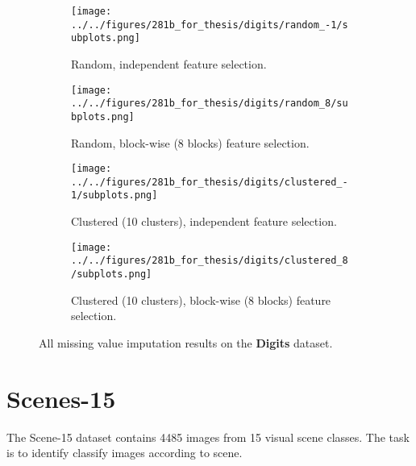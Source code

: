\begin{figure}[ht]
    \centering
    \begin{subfigure}[b]{.9\textwidth}
        \centering
        \texttt{[image: ../../figures/281b\_for\_thesis/digits/random\_-1/subplots.png]}
        \caption{Random, independent feature selection.\vspace{.2cm}}
    \end{subfigure}
    \begin{subfigure}[b]{.9\textwidth}
        \centering
        \texttt{[image: ../../figures/281b\_for\_thesis/digits/random\_8/subplots.png]}
        \caption{Random, block-wise (8 blocks) feature selection.\vspace{.2cm}}
    \end{subfigure}
    \begin{subfigure}[b]{\textwidth}
        \centering
        \texttt{[image: ../../figures/281b\_for\_thesis/digits/clustered\_-1/subplots.png]}
        \caption{Clustered (10 clusters), independent feature selection.\vspace{.2cm}}
    \end{subfigure}
    \begin{subfigure}[b]{\textwidth}
        \centering
        \texttt{[image: ../../figures/281b\_for\_thesis/digits/clustered\_8/subplots.png]}
        \caption{Clustered (10 clusters), block-wise (8 blocks) feature selection.\vspace{.2cm}}
    \end{subfigure}
    \caption{All missing value imputation results on the \textbf{Digits} dataset.}
    \label{fig:digits}
\end{figure}

\section{Scenes-15}
The Scene-15 dataset \parencite{Lazebnik-CVPR-2006} contains 4485 images from 15 visual scene classes.
The task is to identify classify images according to scene.

